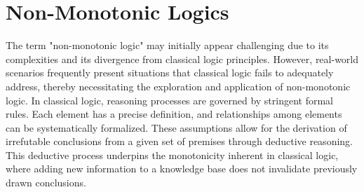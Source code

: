 

\section{Non-Monotonic Logics}
The term "non-monotonic logic" may initially appear challenging due to its complexities and its divergence from classical logic principles.
However, real-world scenarios frequently present situations that classical logic fails to adequately address, thereby necessitating the exploration and application of non-monotonic logic.
In classical logic, reasoning processes are governed by stringent formal rules.
Each element has a precise definition, and relationships among elements can be systematically formalized.
These assumptions allow for the derivation of irrefutable conclusions from a given set of premises through deductive reasoning.
This deductive process underpins the monotonicity inherent in classical logic, where adding new information to a knowledge base does not invalidate previously drawn conclusions.

